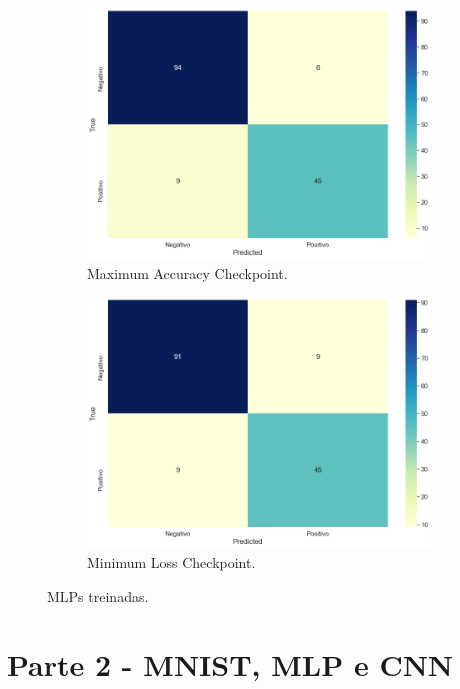 \documentclass[12pt]{article}
\begin{document}
\begin{figure}[H]
	\begin{subfigure}{0.49\linewidth}
		\centering
		\includegraphics[width=\linewidth]{Imagens/conf_max_acc.png}
		\caption{Maximum Accuracy Checkpoint.}
		\label{fig:conf_max_acc}
	\end{subfigure}
	\hfill
	\begin{subfigure}{0.49\linewidth}
		\centering
		\includegraphics[width=\linewidth]{Imagens/conf_min_loss.png}
		\caption{Minimum Loss Checkpoint.}
		\label{fig:conf_min_loss}
	\end{subfigure}
	\caption{MLPs treinadas.}
	\label{fig:comp_mlp_f}
\end{figure}

\pagebreak
\section*{Parte 2 - MNIST, MLP e CNN}
\end{document}
